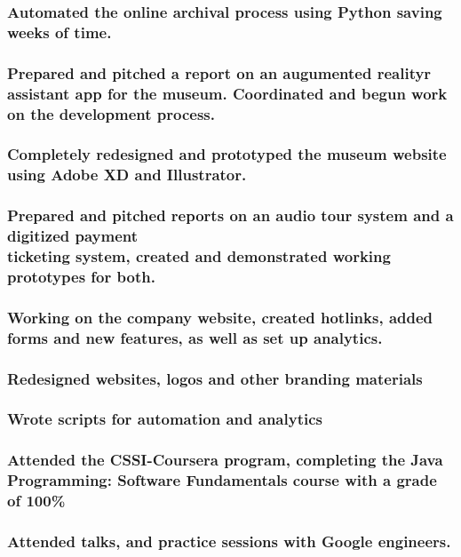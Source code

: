 \documentclass[a4paper]{resume}
\begin{document}
\subsubsection{Automated the online archival process using Python saving weeks of time.}
\subsubsection{Prepared and pitched a report on an augumented realityr assistant app for the museum. Coordinated and begun work on the development process.}
\subsubsection{Completely redesigned and prototyped the museum website using Adobe XD and Illustrator.}
\subsubsection{Prepared and pitched reports on an audio tour system and a digitized payment\\ticketing system, created and demonstrated working prototypes for both.}

\subsubsection{Working on the company website, created hotlinks, added forms and new features, as well as set up analytics.}

\subsubsection{Redesigned websites, logos and other branding materials}
\subsubsection{Wrote scripts for automation and analytics}

\subsubsection{Attended the CSSI-Coursera program, completing the Java Programming: Software Fundamentals course with a grade of 100\%}
\subsubsection{Attended talks, and practice sessions with Google engineers.}
\end{document}
